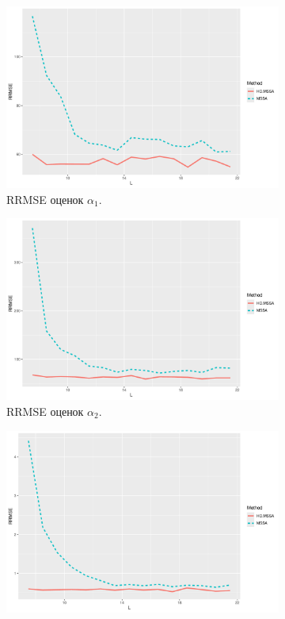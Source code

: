 \documentclass[specialist,
  substylefile=spbu_report.rtx,
subf,href,colorlinks=true, 12pt]{disser}
\theoremstyle{plain}
\theoremstyle{definition}
\theoremstyle{remark}
\begin{document}
\begin{figure}[!ht]
  \centering
  \begin{subfigure}{0.49\linewidth}
    \includegraphics[width=\linewidth, height=0.19\textheight]{rate1_L_small_eq_rates.pdf}
    \caption{RRMSE оценок $\alpha_1$.}
    \label{fig:rate1_L_small_eq_rates}
  \end{subfigure}
  \begin{subfigure}{0.49\linewidth}
    \includegraphics[width=\linewidth, height=0.19\textheight]{rate2_L_small_eq_rates.pdf}
    \caption{RRMSE оценок $\alpha_2$.}
    \label{fig:rate2_L_small_eq_rates}
  \end{subfigure}
  \begin{subfigure}{0.49\linewidth}
    \includegraphics[width=\linewidth, height=0.19\textheight]{freq1_L_small_eq_rates.pdf}

\end{subfigure}
\end{figure}
\end{document}
